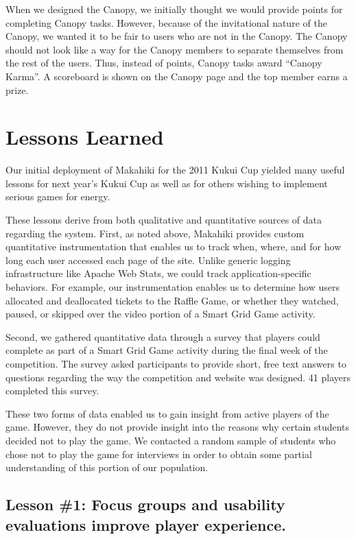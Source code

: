 \documentclass{acm_proc_article-sp}
\begin{document}
When we designed the Canopy, we initially thought we would provide points for completing Canopy tasks. However, because of the invitational nature of the Canopy, we wanted it to be fair to users who are not in the Canopy. The Canopy should not look like a way for the Canopy members to separate themselves from the rest of the users. Thus, instead of points, Canopy tasks award ``Canopy Karma''. A scoreboard is shown on the Canopy page and the top member earns a prize.

\section{Lessons Learned}

Our initial deployment of Makahiki for the 2011 Kukui Cup yielded many
useful lessons for next year's Kukui Cup as well as for others wishing to
implement serious games for energy. 

These lessons derive from both qualitative and quantitative sources of data
regarding the system.  First, as noted above, Makahiki provides custom quantitative
instrumentation that enables us to track when, where, and for how long each
user accessed each page of the site.  Unlike generic logging infrastructure
like Apache Web Stats, we could track application-specific behaviors. For
example, our instrumentation enables us to determine how users allocated
and deallocated tickets to the Raffle Game, or whether they watched,
paused, or skipped over the video portion of a Smart Grid Game activity.

Second, we gathered quantitative data through a survey that players could
complete as part of a Smart Grid Game activity during the final week of the
competition. The survey asked participants to provide short, free text
answers to questions regarding the way the competition and website was
designed.   41 players completed this survey.

These two forms of data enabled us to gain insight from active players of
the game.  However, they do not provide insight into the reasons why
certain students decided not to play the game.  We contacted a random
sample of students who chose not to play the game for interviews in order
to obtain some partial understanding of this portion of our population.

\subsection{Lesson \#1: Focus groups and usability evaluations improve player
  experience.}
\end{document}
